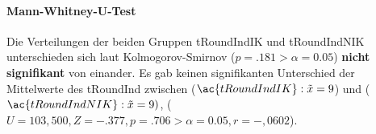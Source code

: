 \documentclass[a4paper,11pt]{article}%
\renewcommand{\\}{\vspace*{0.5\baselineskip} \newline}
\begin{document}
\paragraph{Mann-Whitney-U-Test}
Die Verteilungen der beiden Gruppen \ac{tRoundIndIK} und \ac{tRoundIndNIK} unterschieden sich laut Kolmogorov-Smirnov ($p = .181 > \alpha = 0.05$) \textbf{nicht signifikant} von einander. Es gab keinen signifikanten Unterschied der Mittelwerte des \ac{tRoundInd} zwischen ($\ac{tRoundIndIK} : \tilde x = 9$) und ($\ac{tRoundIndNIK} : \tilde x = 9)$, ($U = 103,500, Z = -.377, p = .706 > \alpha = 0.05, r = -,0602$).

\end{document}

